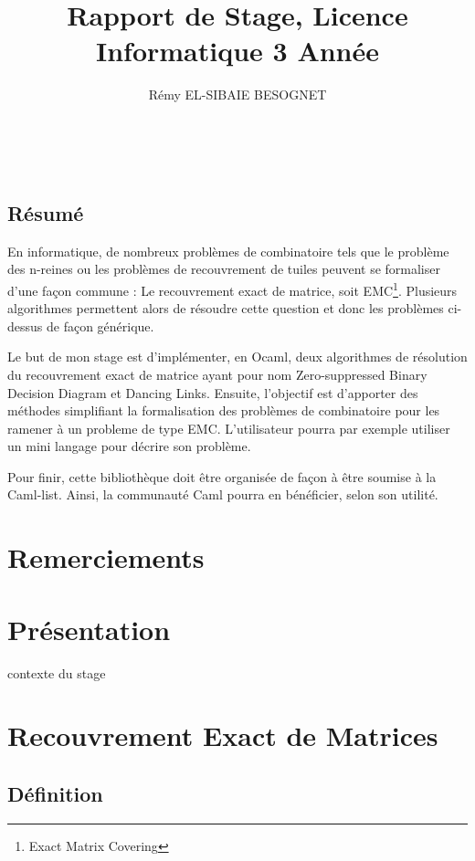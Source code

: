 \documentclass[a4paper]{article}
\title{Rapport de Stage, Licence Informatique 3\up{ème} Année}
\author{Rémy \textsc{EL-SIBAIE BESOGNET}}
\begin{document}


~
\vfill

\begin{center}
\section*{Résumé}
\end{center}
En informatique, de nombreux problèmes de combinatoire tels que le problème des 
n-reines ou les problèmes de recouvrement de tuiles peuvent se formaliser d'une
façon commune :
Le recouvrement exact de matrice, soit EMC\footnote{Exact Matrix Covering}. 
Plusieurs algorithmes permettent alors 
de résoudre cette question et donc les problèmes ci-dessus de façon générique.

Le but de mon stage est d'implémenter, en Ocaml, deux algorithmes de
résolution du recouvrement exact de matrice ayant pour nom 
Zero-suppressed Binary Decision
Diagram et Dancing Links. 
Ensuite, l'objectif est d'apporter des méthodes 
simplifiant la formalisation des problèmes de combinatoire pour les ramener
à un probleme de type EMC. L'utilisateur pourra par 
exemple utiliser un mini langage pour décrire son problème.

Pour finir, cette bibliothèque doit être organisée de façon à être soumise à la 
Caml-list. Ainsi, la communauté Caml pourra en bénéficier, selon son utilité.

\vfill




\newpage
\section*{Remerciements}

\newpage
\tableofcontents
\newpage
\listoffigures

\newpage
\section{Présentation}

contexte du stage

\section{Recouvrement Exact de Matrices}

\subsection{Définition}
\end{document}
